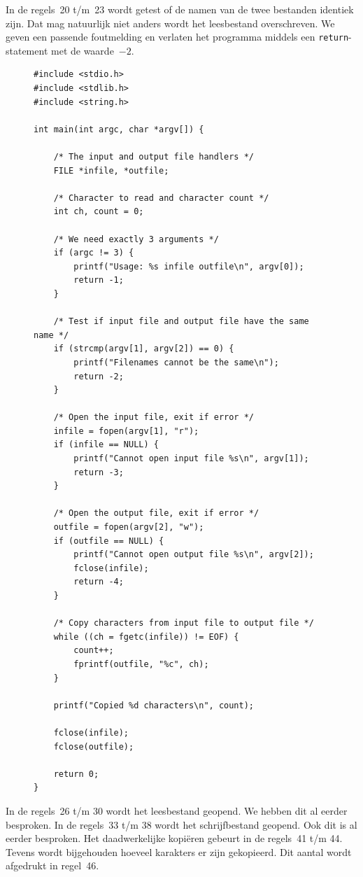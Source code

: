 \documentclass[a4paper,12pt,twoside]{article}
\begin{document}
In de regels~20 t/m~23 wordt getest of de namen van de twee bestanden identiek zijn.
Dat mag natuurlijk niet anders wordt het leesbestand overschreven. We geven een
passende foutmelding en verlaten het programma middels een \lstinline|return|-statement
met de waarde~$-2$.

\begin{figure}[!p]
\begin{lstlisting}[caption=Programma om een bestand te kopi\"eren.,label=cod:filecopy]
#include <stdio.h>
#include <stdlib.h>
#include <string.h>

int main(int argc, char *argv[]) {

    /* The input and output file handlers */
    FILE *infile, *outfile;

    /* Character to read and character count */
    int ch, count = 0;

    /* We need exactly 3 arguments */
    if (argc != 3) {
        printf("Usage: %s infile outfile\n", argv[0]);
        return -1;
    }

    /* Test if input file and output file have the same name */
    if (strcmp(argv[1], argv[2]) == 0) {
        printf("Filenames cannot be the same\n");
        return -2;
    }

    /* Open the input file, exit if error */
    infile = fopen(argv[1], "r");
    if (infile == NULL) {
        printf("Cannot open input file %s\n", argv[1]);
        return -3;
    }

    /* Open the output file, exit if error */
    outfile = fopen(argv[2], "w");
    if (outfile == NULL) {
        printf("Cannot open output file %s\n", argv[2]);
        fclose(infile);
        return -4;
    }

    /* Copy characters from input file to output file */
    while ((ch = fgetc(infile)) != EOF) {
        count++;
        fprintf(outfile, "%c", ch);
    }

    printf("Copied %d characters\n", count);

    fclose(infile);
    fclose(outfile);

    return 0;
}
\end{lstlisting}
\end{figure}

In de regels~26 t/m 30 wordt het leesbestand geopend. We hebben dit al eerder besproken.
In de regels~33 t/m 38 wordt het schrijfbestand geopend. Ook dit is al eerder besproken.
Het daadwerkelijke kopi\"eren gebeurt in de regels~41 t/m 44. Tevens wordt bijgehouden
hoeveel karakters er zijn gekopieerd. Dit aantal wordt afgedrukt in regel~46.
\end{document}
